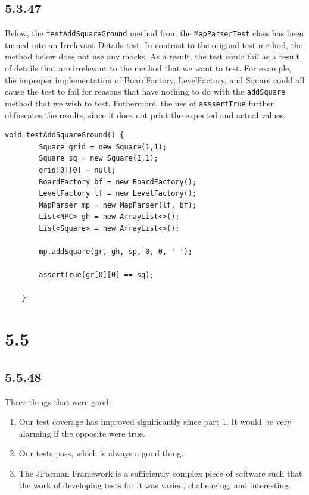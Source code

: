 \documentclass[]{article}
\providecommand{\tightlist}{%
  \setlength{\itemsep}{0pt}\setlength{\parskip}{0pt}}
\begin{document}
\subsection{5.3.47}\label{section-25}

Below, the \texttt{testAddSquareGround} method from the
\texttt{MapParserTest} class has been turned into an Irrelevant Details
test. In contrast to the original test method, the method below does not
use any mocks. As a result, the test could fail as a result of details
that are irrelevant to the method that we want to test. For example, the
improper implementation of BoardFactory, LevelFactory, and Square could
all cause the test to fail for reasons that have nothing to do with the
\texttt{addSquare} method that we wish to test. Futhermore, the use of
\texttt{asssertTrue} further obfuscates the results, since it does not
print the expected and actual values.

\begin{verbatim}
void testAddSquareGround() {
        Square grid = new Square(1,1);
        Square sq = new Square(1,1);
        grid[0][0] = null;
        BoardFactory bf = new BoardFactory();
        LevelFactory lf = new LevelFactory();
        MapParser mp = new MapParser(lf, bf);
        List<NPC> gh = new ArrayList<>();
        List<Square> = new ArrayList<>();

        mp.addSquare(gr, gh, sp, 0, 0, ' ');
        
        assertTrue(gr[0][0] == sq);

    }
\end{verbatim}

\section{5.5}\label{section-26}

\subsection{5.5.48}\label{section-27}

Three things that were good:

\begin{enumerate}
\def\labelenumi{\arabic{enumi}.}
\tightlist
\item
  Our test coverage has improved significantly since part 1. It would be
  very alarming if the opposite were true.
\item
  Our tests pass, which is always a good thing.
\item
  The JPacman Framework is a sufficiently complex piece of software such
  that the work of developing tests for it was varied, challenging, and
  interesting.
\end{enumerate}
\end{document}
